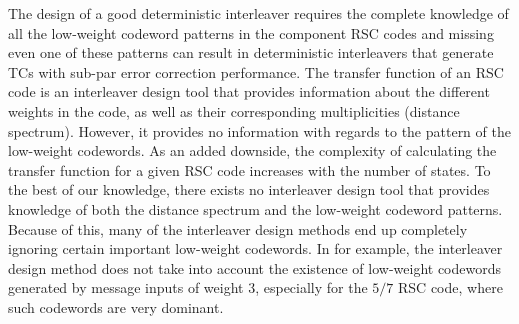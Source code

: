 

The design of a good deterministic interleaver requires the complete knowledge of all the low-weight codeword patterns in the component RSC codes and missing even one of these patterns can result in deterministic interleavers that generate TCs with sub-par error correction performance.
The transfer function of an RSC code is an interleaver design tool that provides information about the different weights in the code, as well as their corresponding multiplicities (distance spectrum). However, it provides no information with regards to the pattern of the low-weight codewords. As an added downside, the complexity of calculating the transfer function for a given RSC code increases with the number of states. To the best of our knowledge, there exists no interleaver design tool that provides knowledge of both the distance spectrum and the low-weight codeword patterns. Because of this, many of the interleaver design methods end up completely ignoring certain important low-weight codewords. In \cite{ref5} for example, the interleaver design method does not take into account the existence of low-weight codewords generated by message inputs of weight 3, especially for the $5/7$  RSC code, where such codewords are very dominant.

